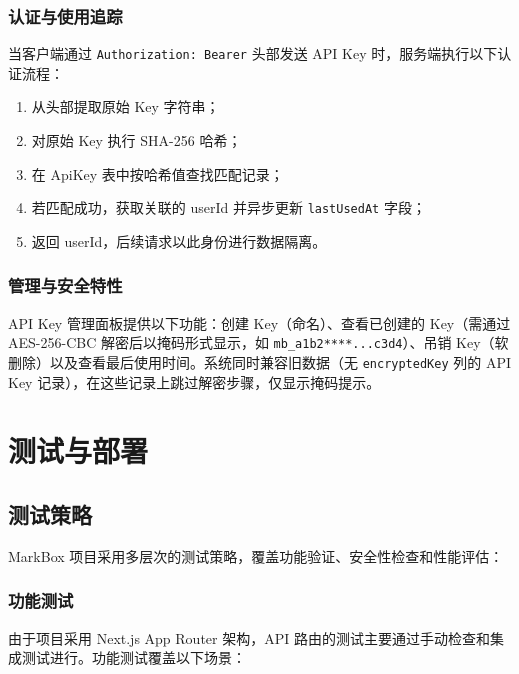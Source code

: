 \documentclass[12pt,a4paper]{ctexart}
\begin{document}
\subsubsection{认证与使用追踪}

当客户端通过 \texttt{Authorization: Bearer} 头部发送 API Key 时，服务端执行以下认证流程：

\begin{enumerate}
  \item 从头部提取原始 Key 字符串；
  \item 对原始 Key 执行 SHA-256 哈希；
  \item 在 ApiKey 表中按哈希值查找匹配记录；
  \item 若匹配成功，获取关联的 userId 并异步更新 \texttt{lastUsedAt} 字段；
  \item 返回 userId，后续请求以此身份进行数据隔离。
\end{enumerate}

\subsubsection{管理与安全特性}

API Key 管理面板提供以下功能：创建 Key（命名）、查看已创建的 Key（需通过 AES-256-CBC 解密后以掩码形式显示，如 \texttt{mb\_a1b2****...c3d4}）、吊销 Key（软删除）以及查看最后使用时间。系统同时兼容旧数据（无 \texttt{encryptedKey} 列的 API Key 记录），在这些记录上跳过解密步骤，仅显示掩码提示。

\section{测试与部署}
\label{sec:testing}

\subsection{测试策略}

MarkBox 项目采用多层次的测试策略，覆盖功能验证、安全性检查和性能评估：

\subsubsection{功能测试}

由于项目采用 Next.js App Router 架构，API 路由的测试主要通过手动检查和集成测试进行。功能测试覆盖以下场景：
\end{document}
